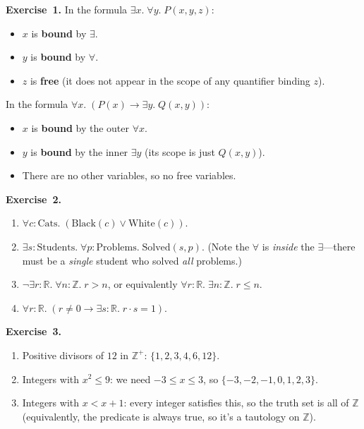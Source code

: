 \documentclass[11pt]{article}
\begin{document}
\textbf{Exercise~1.}
In the formula $\exists x.\;\forall y.\;P(x, y, z)$:
\begin{itemize}
  \item $x$ is \textbf{bound} by $\exists$.
  \item $y$ is \textbf{bound} by $\forall$.
  \item $z$ is \textbf{free} (it does not appear in the scope of any
        quantifier binding $z$).
\end{itemize}
In the formula $\forall x.\;(P(x) \to \exists y.\;Q(x, y))$:
\begin{itemize}
  \item $x$ is \textbf{bound} by the outer $\forall x$.
  \item $y$ is \textbf{bound} by the inner $\exists y$ (its scope is just $Q(x, y)$).
  \item There are no other variables, so no free variables.
\end{itemize}

\medskip
\textbf{Exercise~2.}
\begin{enumerate}[label=(\alph*)]
  \item $\forall c : \text{Cats}.\;(\text{Black}(c) \vee \text{White}(c))$.
  \item $\exists s : \text{Students}.\;\forall p : \text{Problems}.\;\text{Solved}(s, p)$. (Note the $\forall$ is \emph{inside} the $\exists$---there must be a \emph{single} student who solved \emph{all} problems.)
  \item $\lnot \exists r : \mathbb{R}.\;\forall n : \mathbb{Z}.\;r > n$, or equivalently $\forall r : \mathbb{R}.\;\exists n : \mathbb{Z}.\;r \leq n$.
  \item $\forall r : \mathbb{R}.\;(r \neq 0 \to \exists s : \mathbb{R}.\;r \cdot s = 1)$.
\end{enumerate}

\medskip
\textbf{Exercise~3.}
\begin{enumerate}[label=(\alph*)]
  \item Positive divisors of $12$ in $\mathbb{Z}^+$: $\{1, 2, 3, 4, 6, 12\}$.
  \item Integers with $x^2 \leq 9$: we need $-3 \leq x \leq 3$, so $\{-3, -2, -1, 0, 1, 2, 3\}$.
  \item Integers with $x < x + 1$: every integer satisfies this, so the truth set is all of $\mathbb{Z}$ (equivalently, the predicate is always true, so it's a tautology on $\mathbb{Z}$).
\end{enumerate}
\end{document}
